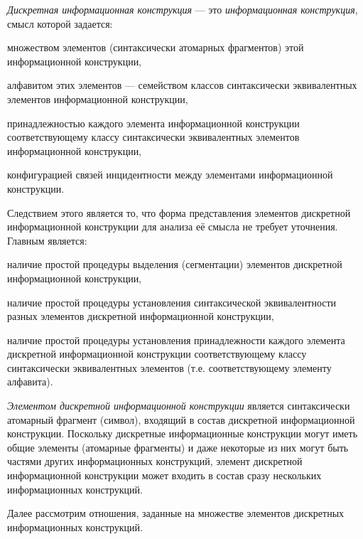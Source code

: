 \textit{Дискретная информационная конструкция} — это \textit{информационная конструкция}, смысл которой задается:
\begin{textitemize}
    \item множеством элементов (синтаксически атомарных фрагментов) этой информационной конструкции,
    \item алфавитом этих элементов — семейством классов синтаксически эквивалентных элементов информационной конструкции,
    \item принадлежностью каждого элемента информационной конструкции соответствующему классу синтаксически эквивалентных элементов информационной конструкции,
    \item конфигурацией связей инцидентности между элементами информационной конструкции.
\end{textitemize}

Следствием этого является то, что форма представления элементов дискретной информационной конструкции для анализа её смысла не требует уточнения. Главным является:
\begin{textitemize}
    \item наличие простой процедуры выделения (сегментации) элементов дискретной информационной конструкции,
    \item наличие простой процедуры установления синтаксической эквивалентности разных элементов дискретной информационной конструкции,
    \item наличие простой процедуры установления принадлежности каждого элемента дискретной информационной конструкции соответствующему классу синтаксически эквивалентных элементов (т.е. соответствующему элементу алфавита).
\end{textitemize}

\textit{Элементом дискретной информационной конструкции} является синтаксически атомарный фрагмент (символ), входящий в состав дискретной информационной конструкции. Поскольку дискретные информационные конструкции могут иметь общие элементы (атомарные фрагменты) и даже некоторые из них могут быть частями других информационных конструкций, элемент дискретной информационной конструкции может входить в состав сразу нескольких информационных конструкций.

Далее рассмотрим отношения, заданные на множестве элементов дискретных информационных конструкций.

\begin{SCn}


\end{SCn}

